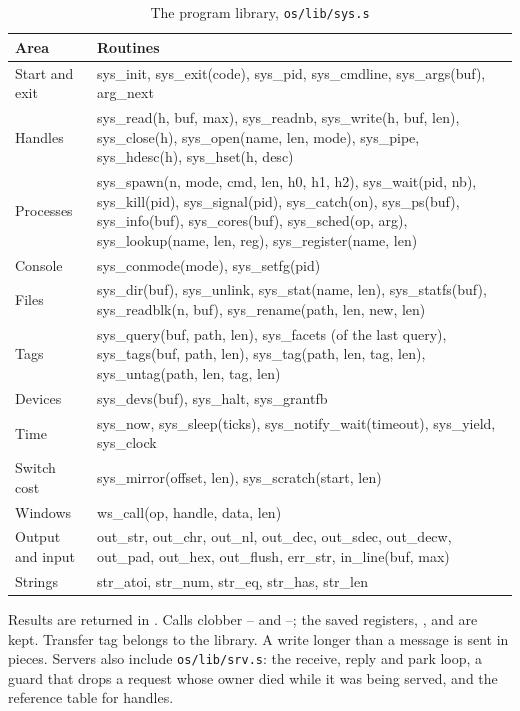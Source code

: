 \begin{table}[htbp]
\centering\small
\caption{The program library, \texttt{os/lib/sys.s}}\label{tab:syslib}
\begin{tabularx}{\linewidth}{@{}l >{\ttfamily\raggedright\arraybackslash}X@{}}
\toprule
\textbf{Area} & \textrm{\bfseries Routines}\\\midrule
Start and exit & sys\_init, sys\_exit(code), sys\_pid, sys\_cmdline, sys\_args(buf), arg\_next\\
Handles & sys\_read(h, buf, max), sys\_readnb, sys\_write(h, buf, len), sys\_close(h),
  sys\_open(name, len, mode), sys\_pipe, sys\_hdesc(h), sys\_hset(h, desc)\\
Processes & sys\_spawn(n, mode, cmd, len, h0, h1, h2), sys\_wait(pid, nb), sys\_kill(pid),
  sys\_signal(pid), sys\_catch(on), sys\_ps(buf), sys\_info(buf), sys\_cores(buf),
  sys\_sched(op, arg), sys\_lookup(name, len, reg), sys\_register(name, len)\\
Console & sys\_conmode(mode), sys\_setfg(pid)\\
Files & sys\_dir(buf), sys\_unlink, sys\_stat(name, len), sys\_statfs(buf), sys\_readblk(n, buf),
  sys\_rename(path, len, new, len)\\
Tags & sys\_query(buf, path, len), sys\_facets (of the last query), sys\_tags(buf, path, len),
  sys\_tag(path, len, tag, len), sys\_untag(path, len, tag, len)\\
Devices & sys\_devs(buf), sys\_halt, sys\_grantfb\\
Time & sys\_now, sys\_sleep(ticks), sys\_notify\_wait(timeout), sys\_yield, sys\_clock\\
Switch cost & sys\_mirror(offset, len), sys\_scratch(start, len)\\
Windows & ws\_call(op, handle, data, len)\\
Output and input & out\_str, out\_chr, out\_nl, out\_dec, out\_sdec, out\_decw, out\_pad, out\_hex,
  out\_flush, err\_str, in\_line(buf, max)\\
Strings & str\_atoi, str\_num, str\_eq, str\_has, str\_len\\
\bottomrule
\end{tabularx}
\end{table}

Results are returned in . Calls clobber -- and --; the saved
registers, ,  and  are kept. Transfer tag  belongs to the library. A
write longer than a message is sent in pieces. Servers also include \texttt{os/lib/srv.s}: the
receive, reply and park loop, a guard that drops a request whose owner died while it was being served,
and the reference table for handles.

